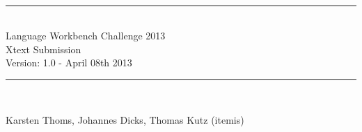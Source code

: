 \begin{titlepage}

\begin{center}

\\[3cm]


\rule{\linewidth}{0.7mm}
\\[0.4cm]


    \selectfont
    \LARGE{\color{darkblue}Language Workbench Challenge 2013 \\
    Xtext Submission} \\[0.5cm]

    \color{black}
    \large{Version: 1.0 - April 08th 2013}
    \\[0.4cm]
\rule{\linewidth}{0.7mm}
\\[1.5cm]
\normalfont

\selectfont
Karsten Thoms, Johannes Dicks, Thomas Kutz (itemis)
\normalfont

\vfill


\end{center}

\end{titlepage}  